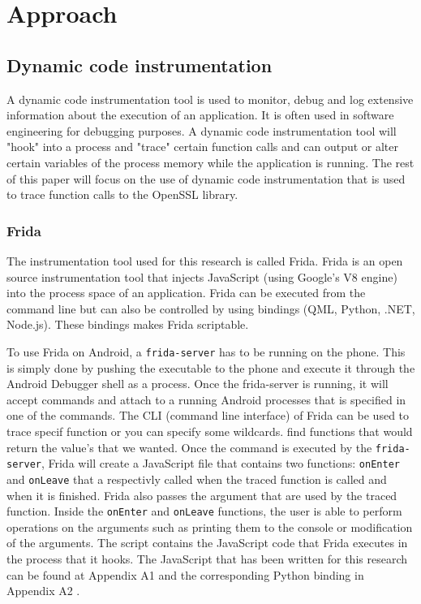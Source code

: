 \documentclass[12pt, a4paper]{report}
\begin{document}
\chapter{Approach}
\section{Dynamic code instrumentation}

A dynamic code instrumentation tool is used to monitor, debug and log extensive information about the execution of an application. It is often used in software engineering for debugging purposes. A dynamic code instrumentation tool will "hook" into a process and "trace" certain function calls and can output or alter certain variables of the process memory while the application is running.
\newline
\newline
The rest of this paper will focus on the use of dynamic code instrumentation that is used to trace function calls to the OpenSSL library. 

\subsection{Frida}

The instrumentation tool used for this research is called Frida. Frida is an open source instrumentation tool that injects JavaScript (using Google's V8 engine) into the process space of an application. Frida can be executed from the command line but can also be controlled by using bindings (QML, Python, .NET, Node.js). These bindings makes Frida scriptable\cite{frida}. 

To use Frida on Android, a \texttt{frida-server} has to be running on the phone. This is simply done by pushing the executable to the phone and execute it through the Android Debugger shell as a process. Once the frida-server is running, it will accept commands and attach to a running Android processes that is specified in one of the commands.
\newline
\newline
The CLI (command line interface) of Frida can be used to trace specif function or you can specify some wildcards. find functions that would return the value's that we wanted. Once the command is executed by the \texttt{frida-server}, Frida will create a JavaScript file that contains two functions: \texttt{onEnter} and \texttt{onLeave} that a respectivly called when the traced function is called and when it is finished. Frida also passes the argument that are used by the traced function. Inside the \texttt{onEnter} and \texttt{onLeave} functions, the user is able to perform operations on the arguments such as printing them to the console or modification of the arguments. 
 The script contains the JavaScript code that Frida executes in the process that it hooks. The JavaScript that has been written for this research can be found at Appendix A1 and the corresponding Python binding in Appendix A2 .
\clearpage
\end{document}

